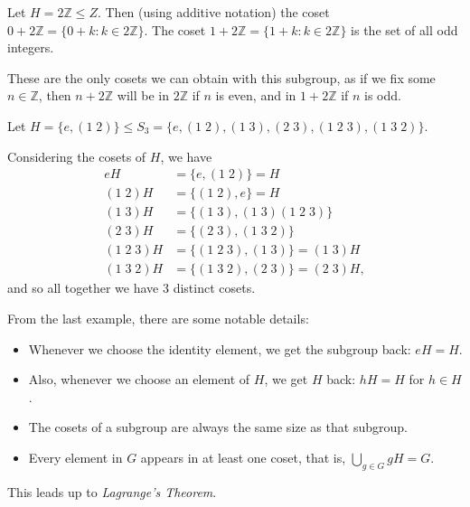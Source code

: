\documentclass[a4paper]{scrartcl}
\begin{document}
\begin{example}
Let $H = 2\mathbb{Z} \leq Z$. Then (using additive notation) the coset $0 + 2\mathbb{Z} = \{0 + k : k \in 2\mathbb{Z}\}$. The coset $1 + 2\mathbb{Z} = \{1 + k : k \in 2\mathbb{Z}\}$ is the set of all odd integers.  

These are the only cosets we can obtain with this subgroup, as if we fix some $n \in \mathbb{Z}$, then $n + 2\mathbb{Z}$ will be in $2\mathbb{Z}$ if $n$ is even, and in $1 + 2\mathbb{Z}$ if $n$ is odd.
\end{example}

\begin{example}
	Let $H = \{ e, (1\; 2) \} \leq S_3 = \{e, (1\; 2), (1\; 3), (2\; 3), (1\; 2\; 3), (1\; 3\; 2)\}$.

	Considering the cosets of $H$, we have 
	\begin{align*}
		eH &= \{ e, (1\; 2) \} = H \\
		(1\; 2) H &= \{(1\; 2), e\} = H \\
		(1\; 3) H &= \{ (1\; 3), (1\; 3)(1\; 2\; 3)\} \\
		(2\; 3) H &= \{(2\; 3), (1\; 3\; 2)\}\\
		(1\; 2\; 3) H &= \{ (1\; 2\; 3), (1\; 3)\} = (1\; 3)H\\
		(1\; 3\; 2) H &= \{(1\; 3\; 2), (2\; 3)\} = (2\; 3)H,
	\end{align*}
	and so all together we have 3 distinct cosets.
\end{example}

From the last example, there are some notable details:
\begin{itemize}
	\item Whenever we choose the identity element, we get the subgroup back: $eH = H$.
	\item Also, whenever we choose an element of $H$, we get $H$ back: $h H= H$ for $h \in H$.
	\item The cosets of a subgroup are always the same size as that subgroup.
	\item Every element in $G$ appears in at least one coset, that is, $\displaystyle \bigcup_{g \in G} gH = G$.
\end{itemize}

This leads up to \emph{Lagrange's Theorem}.
\end{document}
